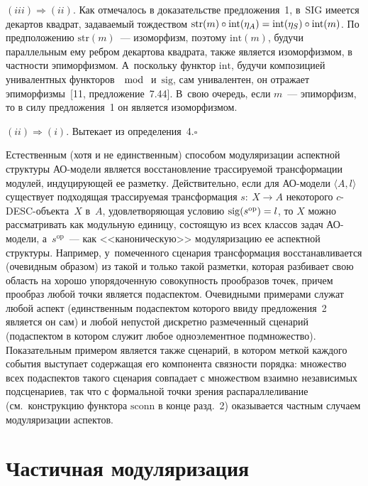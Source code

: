 \begin{multicols}{2}
 $(iii) \Rightarrow (ii)$. Как отмечалось в доказательстве предложения~1,
 в~$\mathrm{SIG}$ имеется декартов \mbox{квад\-рат}, задаваемый тождеством $\mathrm{str}(m) \circ \mathrm{int}(\eta_A)
\hm= \mathrm{int}(\eta_S) \circ \mathrm{int}(m)$. По предположению $\mathrm{str}(m)$~--- изоморфизм,
поэтому $\mathrm{int}(m)$, будучи параллельным ему ребром декартова квадрата, также
\mbox{является} изоморфизмом, в частности эпиморфизмом. А~поскольку функтор
$\mathrm{int}$, будучи композицией унивалентных функторов $\mod$ и~$\mathrm{sig}$, сам
унивалентен, он отражает эпиморфизмы~[11, предложение~7.44]. В~свою
очередь, если $m$~--- эпиморфизм, то в силу предложения~1 он является
изоморфизмом.

 $(ii)\Rightarrow (i)$. Вытекает из определения~4.\hfill$\square$

 \smallskip

 Естественным (хотя и не единственным) способом модуляризации аспектной
структуры АО-мо\-де\-ли является восстановление трассируемой
трансформации модулей, индуцирующей ее разметку. Действительно, если для
АО-мо\-де\-ли $\langle A, l\rangle$ существует подходящая трассируемая
трансформация $s:\ X \to A$ некоторого $c$-DESC-объ\-ек\-та~$X$ в~$A$,
удовлетворяющая условию $\mathrm{sig}(s^{\mathrm{op}}) \hm= l$, то $X$ можно
рассматривать как модульную единицу, состоящую из всех классов задач
 АО-мо\-де\-ли, а~$s^{\mathrm{op}}$~--- как <<каноническую>> модуляризацию
ее аспектной структуры. Например, у~помеченного сценария трансформация
восстанавливается (очевидным образом) из такой и только такой разметки,
которая разбивает свою область на хорошо упорядоченную совокупность
прообразов точек, причем прообраз любой точки является подаспектом.
Очевидными примерами служат любой аспект (единственным подаспектом
которого ввиду предложения~2 является он сам) и любой непустой дискретно
размеченный сценарий (подаспектом в котором служит любое одноэлементное
подмножество).
Показательным примером является также сценарий, в котором
меткой каждого события выступает содержащая его компонента связности
порядка: множество всех подаспектов такого сценария совпадает с множеством
взаимно независимых подсценариев, так что с формальной точки зрения
распараллеливание (см.\ конструкцию функтора $\mathrm{sconn}$ в конце разд.~2)
оказывается частным случаем модуляризации аспектов.

\section{Частичная модуляризация}


\end{multicols}
